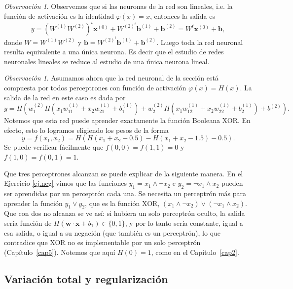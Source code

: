 \documentclass[12pt, a4paper]{amsbook}
\newcommand{\ww}{{\mathbf w}}
\newcommand{\xx}{{\mathbf x}}
\newcommand{\bb}{{\mathbf b}}
\theoremstyle{remark}
\newtheorem{obs}[teo]{Observaci\'on}
\theoremstyle{definition}
\numberwithin{section}{chapter}
\numberwithin{subsection}{section}
\numberwithin{equation}{section}
\numberwithin{figure}{chapter}
\begin{document}
\begin{obs}
Observemos que si las neuronas de la red son lineales, i.e. la función de activación es la identidad $\varphi(x)=x$, entonces la salida es
$$
y= (W^{(1)}W^{(2)})^t \xx^{(0)} + W^{(2)^t} \bb^{(1)}+ \bb^{(2)} = W^t\xx^{(0)} + \bb,
$$
donde $W=W^{(1)}W^{(2)}$ y $\bb = W^{(2)^t} \bb^{(1)}+\bb^{(2)}$. Luego toda la red neuronal resulta equivalente a una única neurona. Es decir que el estudio de redes neuronales lineales se reduce al estudio de una única neurona lineal.
\end{obs}

\begin{obs}\label{obsXOR}
Asumamos ahora que la red neuronal de la sección está compuesta por todos perceptrones con función de activación $\varphi(x) = H(x)$. La salida de la red en este caso es dada por
$$
y = H\left(w_1^{(2)} H(x_1 w_{11}^{(1)} + x_2 w_{21}^{(1)} + b_1^{(1)}) + w_2^{(2)} H(x_1 w_{12}^{(1)} + x_2 w_{22}^{(1)} + b_2^{(1)}) + b^{(2)}\right).
$$
Notemos que esta red puede aprender exactamente la función Booleana XOR. En efecto, esto lo logramos eligiendo los pesos de la forma
$$
y=f(x_1, x_2) = H(H(x_1+x_2 - 0.5) - H(x_1+x_2 - 1.5) - 0.5).
$$
Se puede verificar fácilmente que $f(0,0)=f(1,1)=0$ y $f(1,0)=f(0,1)=1$. 

Que tres perceptrones alcanzan se puede explicar de la siguiente manera. En el Ejercicio \ref{ej.neg} vimos que las funciones $y_1 = x_1\wedge \neg x_2$ e $y_2 = \neg x_1\wedge x_2$ pueden ser aprendidas por un perceptrón cada una. Se necesita un perceptrón más para aprender la función $y_1\vee y_2$, que es la función XOR, $(x_1\wedge \neg x_2)\vee (\neg x_1\wedge x_2)$. Que con dos no alcanza se ve así: si hubiera un solo perceptrón oculto, la salida sería función de $H(\ww\cdot\xx+ b_1)\in\{0,1\}$, y por lo tanto sería constante, igual a esa salida, o igual a su negación (que también es un perceptrón), lo que contradice que XOR no es implementable por un solo perceptrón (Capítulo~\ref{cap5}). Notemos que aquí $H(0)=1$, como en el Capítulo~\ref{cap2}.
\end{obs}

\subsection{Variación total y regularización}
\end{document}
